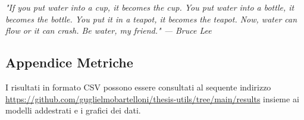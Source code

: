 \documentclass[twoside,openright,titlepage,fleqn,
	headinclude,12pt,a4paper,BCOR5mm,footinclude]{scrbook}
\begin{document}
\frenchspacing
\raggedbottom
{}
\pagestyle{plain}

\pagestyle{scrheadings}
\tableofcontents
\listoffigures
\cleardoublepage
\thispagestyle{empty}
\begin{flushright}
\null{}
\emph{"If you put water into a cup, it becomes the cup. You put water into a bottle, it becomes the bottle. You put it in a teapot, it becomes the teapot. Now, water can flow or it can crash. Be water, my friend." \break --- Bruce Lee} \null
\end{flushright}
\cleardoublepage






\begin{appendices}
\section{Appendice Metriche}\label{appendix:metriche}
  I risultati in formato CSV possono essere consultati al sequente indirizzo \href{https://github.com/guglielmobartelloni/thesis-utils/tree/main/results}{https://github.com/guglielmobartelloni/thesis-utils/tree/main/results} insieme ai modelli addestrati e i grafici dei dati.
\end{appendices}



\end{document}
